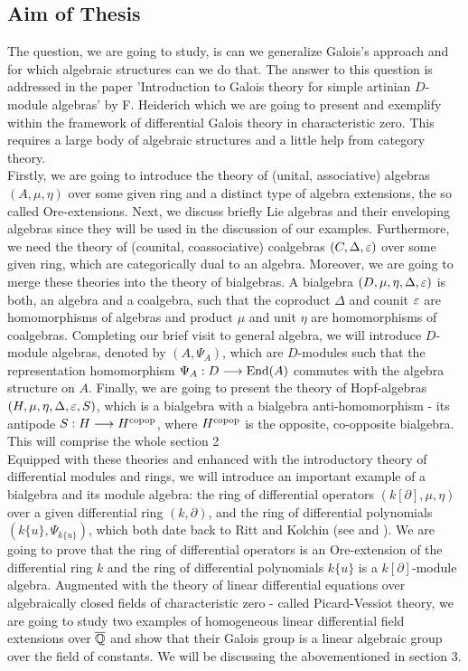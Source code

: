 \subsection{Aim of Thesis}
\indent The question, we are going to study, is can we generalize Galois's approach and for which algebraic structures can we do that. The answer to this question is addressed in the paper 'Introduction to Galois theory for simple artinian $D$-module algebras' by F. Heiderich \cite{Heid13} which we are going to present and exemplify within the framework of differential Galois theory in characteristic zero. This requires a large body of algebraic structures and a little help from category theory.\\
\indent Firstly, we are going to introduce the theory of (unital, associative) algebras $(A,\mu,\eta)$ over some given ring and a distinct type of algebra extensions, the so called Ore-extensions. Next, we discuss briefly Lie algebras and their enveloping algebras since they will be used in the discussion of our examples. Furthermore, we need the theory of (counital, coassociative) coalgebras $(C, \Delta, \varepsilon)$ over some given ring, which are categorically dual to an algebra. Moreover, we are going to merge these theories into the theory of bialgebras. A bialgebra $(D, \mu, \eta, \Delta, \varepsilon)$ is both, an algebra and a coalgebra, such that the coproduct $\Delta$ and counit $\varepsilon$ are homomorphisms of algebras and product $\mu$ and unit $\eta$ are homomorphisms of coalgebras. Completing our brief visit to general algebra, we will introduce $D$-module algebras, denoted by $(A,\Psi_A)$, which are $D$-modules such that the representation homomorphism $\Psi_A : D \longrightarrow \mathrm{End}(A)$ commutes with the algebra structure on $A$. Finally, we are going to present the theory of Hopf-algebras $(H, \mu, \eta, \Delta, \varepsilon, S)$, which is a bialgebra with a bialgebra anti-homomorphism - its antipode $S : H \longrightarrow H^{\mathrm{copop}}$, where $H^{\mathrm{copop}}$ is the opposite, co-opposite bialgebra. This will comprise the whole section 2\medskip\\
\indent Equipped with these theories and enhanced with the introductory theory of differential modules and rings, we will introduce an important example of a bialgebra and its module algebra: the ring of differential operators $(k[\partial], \mu, \eta)$ over a given differential ring $(k, \partial)$, and the ring of differential polynomials $(k\{u\}, \Psi_{k\{u\}})$, which both date back to Ritt and Kolchin (see \cite{Ritt} and \cite{Kol}). We are going to prove that the ring of differential operators is an Ore-extension of the differential ring $k$ and the ring of differential polynomials $k\{u\}$ is a $k[\partial]$-module algebra. Augmented with the theory of linear differential equations over algebraically closed fields of characteristic zero - called Picard-Vessiot theory, we are going to study two examples of homogeneous linear differential field extensions over $\overline{\mathbb{Q}}$ and show that their Galois group is a linear algebraic group over the field of constants. We will be discussing the abovementioned in section 3.\\

